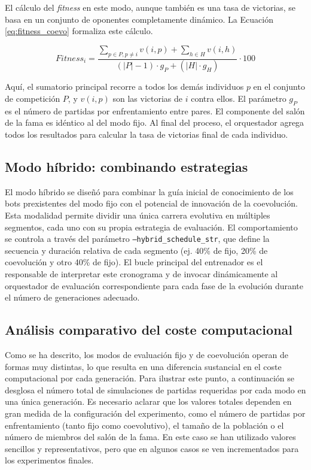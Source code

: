 El cálculo del \textit{fitness} en este modo, aunque también es una tasa de victorias, se basa en un conjunto de oponentes completamente dinámico. La Ecuación \ref{eq:fitness_coevo} formaliza este cálculo.

\begin{equation}
	\textit{Fitness}_{i} = \frac{\sum_{p \in P, p \neq i} v(i, p) + \sum_{h \in H} v(i, h)}{(|P|-1) \cdot g_P + (|H| \cdot g_H)} \cdot 100
	\label{eq:fitness_coevo}
\end{equation}

Aquí, el sumatorio principal recorre a todos los demás individuos $p$ en el conjunto de competición $P$, y $v(i, p)$ son las victorias de $i$ contra ellos. El parámetro $g_P$ es el número de partidas por enfrentamiento entre pares. El componente del salón de la fama es idéntico al del modo fijo. Al final del proceso, el orquestador agrega todos los resultados para calcular la tasa de victorias final de cada individuo.

\subsection{Modo híbrido: combinando estrategias} \label{sec:modo_hibrido_combinando}

El modo híbrido se diseñó para combinar la guía inicial de conocimiento de los bots prexistentes del modo fijo con el potencial de innovación de la coevolución. Esta modalidad permite dividir una única carrera evolutiva en múltiples segmentos, cada uno con su propia estrategia de evaluación. El comportamiento se controla a través del parámetro \texttt{--hybrid\_schedule\_str}, que define la secuencia y duración relativa de cada segmento (ej. 40\% de fijo, 20\% de coevolución y otro 40\% de fijo). El bucle principal del entrenador es el responsable de interpretar este cronograma y de invocar dinámicamente al orquestador de evaluación correspondiente para cada fase de la evolución durante el número de generaciones adecuado.


\subsection{Análisis comparativo del coste computacional} \label{sec:comparativa_coste}

Como se ha descrito, los modos de evaluación fijo y de coevolución operan de formas muy distintas, lo que resulta en una diferencia sustancial en el coste computacional por cada generación. Para ilustrar este punto, a continuación se desglosa el número total de simulaciones de partidas requeridas por cada modo en una única generación. Es necesario aclarar que los valores totales dependen en gran medida de la configuración del experimento, como el número de partidas por enfrentamiento (tanto fijo como coevolutivo), el tamaño de la población o el número de miembros del salón de la fama. En este caso se han utilizado valores sencillos y representativos, pero que en algunos casos se ven incrementados para los experimentos finales.

